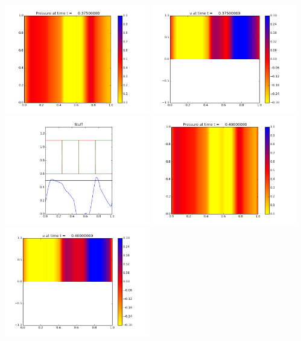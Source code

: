\documentclass[11pt]{article}
\begin{document}
\vskip 10pt 
\includegraphics[width=0.475\textwidth]{frame0015fig0.png}
\includegraphics[width=0.475\textwidth]{frame0015fig1.png}
\vskip 10pt 
\includegraphics[width=0.475\textwidth]{frame0015fig3.png}
\vskip 10pt 
\includegraphics[width=0.475\textwidth]{frame0016fig0.png}
\includegraphics[width=0.475\textwidth]{frame0016fig1.png}
\end{document}
